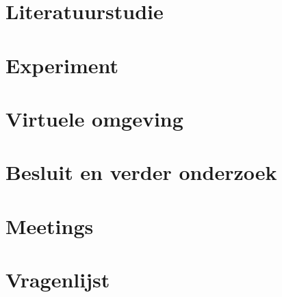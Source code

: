 \documentclass[a4paper,12pt]{report}
\begin{document}
\tableofcontents


\chapter{Literatuurstudie}


\chapter{Experiment}


\chapter{Virtuele omgeving}


\chapter{Besluit en verder onderzoek}



\appendix

\chapter{Meetings}


\chapter{Vragenlijst} \label{vragenlijst}



\newpage


\end{document}
